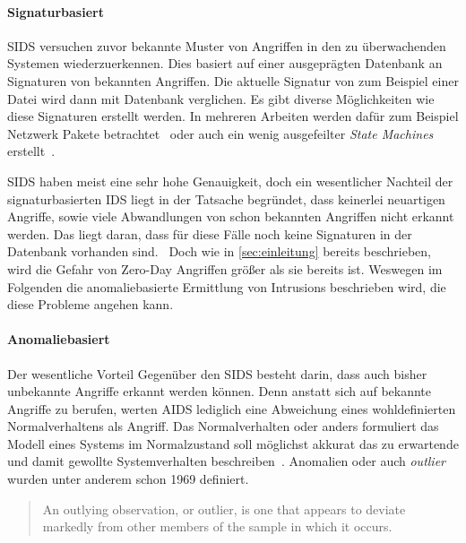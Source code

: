             \paragraph{Signaturbasiert} 
                \ac{SIDS} versuchen zuvor bekannte Muster von Angriffen in den zu überwachenden Systemen wiederzuerkennen.
                Dies basiert auf einer ausgeprägten Datenbank an Signaturen von bekannten Angriffen.
                Die aktuelle Signatur von zum Beispiel einer Datei wird dann mit Datenbank verglichen.
                Es gibt diverse Möglichkeiten wie diese Signaturen erstellt werden. 
                In mehreren Arbeiten werden dafür zum Beispiel Netzwerk Pakete betrachtet~\cite{IDSsurvey}
                oder auch ein wenig ausgefeilter \textit{State Machines} erstellt~\cite{SIDSstate}.

                \ac{SIDS} haben meist eine sehr hohe Genauigkeit, doch ein wesentlicher Nachteil der signaturbasierten IDS liegt in der Tatsache begründet,
                dass keinerlei neuartigen Angriffe, sowie viele Abwandlungen von schon bekannten Angriffen nicht erkannt werden.
                Das liegt daran, dass für diese Fälle noch keine Signaturen in der Datenbank vorhanden sind.~\cite{IDSPIETRO2008}
                Doch wie in \autoref{sec:einleitung} bereits beschrieben, wird die Gefahr von Zero-Day Angriffen größer als sie bereits ist.
                Weswegen im Folgenden die anomaliebasierte Ermittlung von Intrusions beschrieben wird, die diese Probleme angehen kann.

            \paragraph{Anomaliebasiert}
                Der wesentliche Vorteil Gegenüber den \ac{SIDS} besteht darin, dass auch bisher unbekannte Angriffe erkannt werden können.
                Denn anstatt sich auf bekannte Angriffe zu berufen, werten \ac{AIDS} lediglich eine Abweichung eines wohldefinierten Normalverhaltens als Angriff.
                Das Normalverhalten oder anders formuliert das Modell eines Systems im Normalzustand soll möglichst akkurat das zu erwartende und damit gewollte Systemverhalten beschreiben~\cite{ANOMALYBOOKKISHAN2017}.
                Anomalien oder auch \textit{\glqq outlier\grqq\ } wurden unter anderem schon 1969 definiert.

                \blockquote{An outlying observation, or outlier, is one that appears to deviate markedly from other members of the sample in which it occurs.}~\cite{ANOMALYDEFINITION1969}


